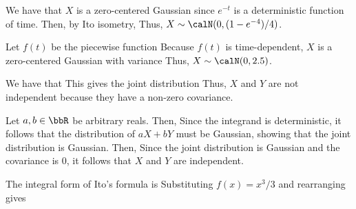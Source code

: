 \documentclass{article}
\begin{document}
\maketitle


We have that $X$ is a zero-centered Gaussian since $e^{-t}$ is a
deterministic function of time. Then, by Ito isometry,
Thus, $X\sim\calN(0,(1-e^{-4})/4)$.


Let $f(t)$ be the piecewise function
Because $f(t)$ is time-dependent, $X$ is a zero-centered Gaussian with variance
Thus, $X\sim\calN(0,2.5)$.


We have that
This gives the joint distribution
Thus, $X$ and $Y$ are not independent because they have a non-zero covariance.


Let $a,b\in \bbR$ be arbitrary reals. Then,
Since the integrand is deterministic, it follows that the
distribution of $aX+bY$ must be Gaussian, showing that the joint
distribution is Gaussian. Then,
Since the joint distribution is Gaussian and the covariance is $0$,
it follows that $X$ and $Y$ are independent.


The integral form of Ito's formula is
Substituting $f(x)=x^3/3$ and rearranging gives

\end{document}
